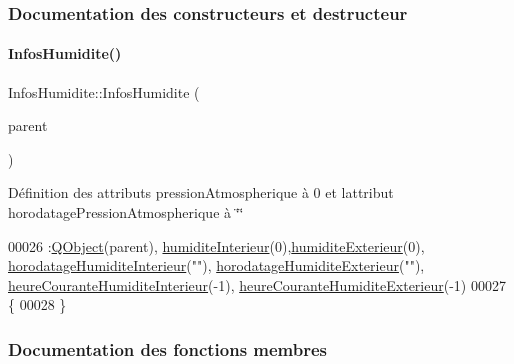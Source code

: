 \subsubsection{Documentation des constructeurs et destructeur}
\mbox{\label{class_infos_humidite_a3c87ffa0e896fd5af90b1d9f15a47a57}} 
\paragraph{\texorpdfstring{Infos\+Humidite()}{InfosHumidite()}}
{\footnotesize\ttfamily Infos\+Humidite\+::\+Infos\+Humidite (\begin{DoxyParamCaption}\item[{\hyperlink{class_q_object}{Q\+Object} $\ast$}]{parent }\end{DoxyParamCaption})}

Définition des attributs pression\+Atmospherique à 0 et l\textquotesingle{}attribut horodatage\+Pression\+Atmospherique à \char`\"{}\char`\"{} 
\begin{DoxyCode}
00026                                             :\hyperlink{class_q_object}{QObject}(parent),
      \hyperlink{class_infos_humidite_ad2847e671ad0b90f8dc0940dee107c38}{humiditeInterieur}(0),\hyperlink{class_infos_humidite_a503a9c849508928d3046292f17f37230}{humiditeExterieur}(0),
      \hyperlink{class_infos_humidite_a38712bac5a2d4d106a016647ad39fedf}{horodatageHumiditeInterieur}(\textcolor{stringliteral}{""}),
      \hyperlink{class_infos_humidite_aa08b4f342e83f8ad437a8272698bb512}{horodatageHumiditeExterieur}(\textcolor{stringliteral}{""}), 
      \hyperlink{class_infos_humidite_a5a8597751ba0fe10a14a12e155421485}{heureCouranteHumiditeInterieur}(-1), 
      \hyperlink{class_infos_humidite_ad7b450373a47ec831872872e0e5674ad}{heureCouranteHumiditeExterieur}(-1)
00027 \{
00028 \}
\end{DoxyCode}


\subsubsection{Documentation des fonctions membres}
\mbox{\label{class_infos_humidite_afc4f6ba3cd4664118ef40f4c12b76506}} 
